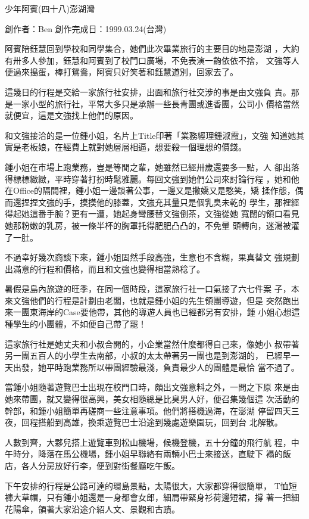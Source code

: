 



少年阿賓(四十八)澎湖灣

創作者：Ben
創作完成日：1999.03.24(台灣)


阿賓陪鈺慧回到學校和同學集合，她們此次畢業旅行的主要目的地是澎湖
，大約有卅多人參加，鈺慧和阿賓到了校門口廣場，不免表演一齣依依不捨，
文強等人便過來搗蛋，棒打鴛鴦，阿賓只好笑著和鈺慧道別，回家去了。

這幾日的行程是交給一家旅行社安排，出面和旅行社交涉的事是由文強負
責。那是一家小型的旅行社，平常大多只是承辦一些長青團或進香團，公司小
價格當然就便宜，這是文強找上他們的原因。

和文強接洽的是一位鍾小姐，名片上Title印著「業務經理鍾淑霞」，文強
知道她其實是老板娘，在經費上就對她層層相逼，想要殺一個理想的價錢。

鍾小姐在市場上跑業務，豈是等閒之輩，她雖然已經卅歲還要多一點，人
卻出落得標標緻緻，平時穿著打扮時髦雅麗。每回文強到她們公司來討論行程
，她和他在Office的隔間裡，鍾小姐一邊談著公事，一邊又是撒嬌又是憨笑，矯
揉作態，偶而還捏捏文強的手，摸摸他的膝蓋，文強充其量只是個乳臭未乾的
學生，那裡經得起她這番手腕？更有一遭，她起身彎腰替文強倒茶，文強從她
寬闊的領口看見她那粉嫩的乳房，被一條半杯的胸罩托得肥肥凸凸的，不免暈
頭轉向，迷湯被灌了一肚。

不過幸好幾次商談下來，鍾小姐固然手段高強，生意也不含糊，果真替文
強規劃出滿意的行程和價格，而且和文強也變得相當熟稔了。

暑假是島內旅遊的旺季，在同一個時段，這家旅行社一口氣接了六七件案
子，本來文強他們的行程是計劃由老闆，也就是鍾小姐的先生領團導遊，但是
突然跑出來一團東海岸的Case要他帶，其他的導遊人員也已經都另有安排，鍾
小姐心想這種學生的小團體，不如便自己帶了罷！

這家旅行社是她丈夫和小叔合開的，小企業當然什麼都得自己來，像她小
叔帶著另一團五百人的小學生去南部，小叔的太太帶著另一團也是到澎湖的，
已經早一天出發，她平時跑業務所以帶團經驗最淺，負責最少人的團體是最恰
當不過了。

當鍾小姐隨著遊覽巴士出現在校門口時，頗出文強意料之外，一問之下原
來是由她來帶團，就又變得很高興，美女相隨總是比臭男人好，便召集幾個這
次活動的幹部，和鍾小姐簡單再磋商一些注意事項。他們將搭機過海，在澎湖
停留四天三夜，回程搭船到高雄，換乘遊覽巴士沿途到幾處遊樂園玩，回到台
北解散。

人數到齊，大夥兒搭上遊覽車到松山機場，候機登機，五十分鐘的飛行航
程，中午時分，降落在馬公機場，鍾小姐早聯絡有兩輛小巴士來接送，直駛下
褟的飯店，各人分房放好行李，便到對街餐廳吃午飯。

下午安排的行程是公路可達的環島景點，太陽很大，大家都穿得很簡單，
T恤短褲大草帽，只有鍾小姐還是一身都會女郎，細肩帶緊身衫荷邊短裙，撐
著一把細花陽傘，領著大家沿途介紹人文、景觀和古蹟。

